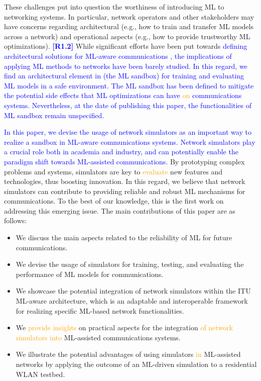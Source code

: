 \documentclass[journal]{IEEEtran}
\begin{document}
	These challenges put into question the worthiness of introducing ML to networking systems. In particular, network operators and other stakeholders may have concerns regarding architectural (e.g., how to train and transfer ML models across a network) and operational aspects (e.g., how to provide trustworthy ML optimizations). \textcolor{blue}{\textbf{[R1.2]}} While significant efforts have been put towards \textcolor{blue}{defining architectural solutions for ML-aware communications \cite{3gpp2019study, ETSI, ITU3172, ITU3174}, the implications of applying ML methods to networks have been barely studied. In this regard, we find an architectural element in \cite{ITU3172} (the ML sandbox) for training and evaluating ML models in a safe environment. The ML sandbox has been defined to mitigate the potential side effects that ML optimizations can have \textcolor{orange}{on} communications systems. Nevertheless, at the date of publishing this paper, the functionalities of ML sandbox remain unspecified.}

	\textcolor{blue}{In this paper, we devise the usage of network simulators as an important way to realize a sandbox in ML-aware communications systems. Network simulators play a crucial role both in academia and industry, and can potentially enable the paradigm shift towards ML-assisted communications.} By prototyping complex problems and systems, simulators are key to \textcolor{orange}{evaluate} new features and technologies, thus boosting innovation. In this regard, we believe that network simulators can contribute to providing reliable and robust ML mechanisms for communications. To the best of our knowledge, this is the first work on addressing this emerging issue. The main contributions of this paper are as follows:
	\begin{itemize}
		\item We discuss the main aspects related to the reliability of ML for future communications.
		\item We devise the usage of simulators for training, testing, and evaluating the performance of ML models for communications.
		\item We showcase the potential integration of network simulators within the ITU ML-aware architecture, which is an adaptable and interoperable framework for realizing specific ML-based network functionalities.
		\item We \textcolor{orange}{provide insights} on practical aspects for the integration \textcolor{orange}{of network simulators into} ML-assisted communications systems. 
		\item We illustrate the potential advantages of using simulators \textcolor{orange}{in} ML-assisted networks by applying the outcome of an ML-driven simulation to a residential WLAN testbed.
	\end{itemize}
\end{document}
